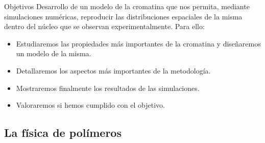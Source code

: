 \documentclass{beamer}
\begin{document}
\begin{frame}{Objetivos}
    Desarrollo de un \alert{modelo} de la cromatina que nos permita, mediante simulaciones numéricas, reproducir las \alert{distribuciones espaciales} de la misma dentro del núcleo que se observan experimentalmente. Para ello:
    \begin{itemize}
        \item Estudiaremos las propiedades más importantes de la cromatina y diseñaremos un modelo de la misma.
        \item Detallaremos los aspectos más importantes de la metodología.
        \item Mostraremos finalmente los resultados de las simulaciones.
        \item Valoraremos si hemos cumplido con el objetivo.
    \end{itemize}
\end{frame}

\subsection{La física de polímeros}
\end{document}
